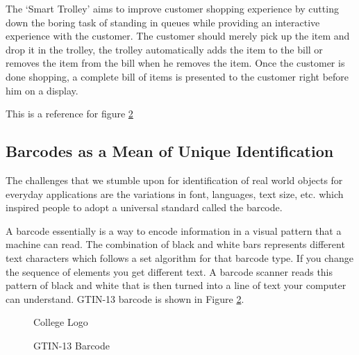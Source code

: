 \documentclass[times, 1pt, a4paper]{article}
\begin{document}
The `Smart Trolley' aims to improve customer shopping experience by cutting down the boring task of standing in queues while providing an interactive experience with the customer. The customer should merely pick up the item and drop it in the trolley, the trolley automatically adds the item to the bill or removes the item from the bill when he removes the item. Once the customer is done shopping, a complete bill of items is presented to the customer right before him on a display. 


This is a reference for figure \ref{fig:barcode}

\subsection*{Barcodes as a Mean of Unique Identification} \label{subsection:barcode}

The challenges that we stumble upon for identification of real world objects for everyday applications are the variations in font, languages, text size, etc. which inspired people to adopt a universal standard called the barcode.

A barcode essentially is a way to encode information in a visual pattern that a machine can read. The combination of black and white bars represents different text characters which follows a set algorithm for that barcode type. If you change the sequence of elements you get different text. A barcode scanner reads this pattern of black and white that is then turned into a line of text your computer can understand. GTIN-13 barcode is shown in Figure \ref{fig:barcode}. 

\begin{figure}[h] 
	\centering
	\centering
	\caption{College Logo}
	\label{fig:coll_logo}
	\end{figure}


  \begin{figure}[h] 
	\centering
	\centering
	\caption{GTIN-13 Barcode}
	\label{fig:barcode}
	\end{figure}
\end{document}
